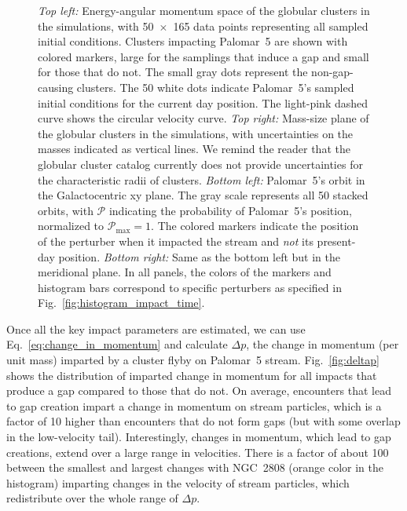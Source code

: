 \begin{figure}
            \caption{\textit{Top left:} Energy-angular momentum space of the globular clusters in the simulations, with 50~$\times$~165 data points representing all sampled initial conditions. Clusters impacting Palomar~5 are shown with colored markers, large for the samplings that induce a gap and small for those that do not. The small gray dots represent the non-gap-causing clusters. The 50 white dots indicate Palomar~5's sampled initial conditions for the current day position. The light-pink dashed curve shows the circular velocity curve. \textit{Top right:} Mass-size plane of the globular clusters in the simulations, with uncertainties on the masses indicated as vertical lines. We remind the reader that the globular cluster catalog currently does not provide uncertainties for the characteristic radii of clusters. \textit{Bottom left:} Palomar~5's orbit in the Galactocentric xy plane. The gray scale represents all 50 stacked orbits, with $\mathcal{P}$ indicating the probability of Palomar~5's position, normalized to $\mathcal{P}_\textrm{max}=1$. The colored markers indicate the position of the perturber when it impacted the stream and \textit{not} its present-day position. \textit{Bottom right:} Same as the bottom left but in the meridional plane. In all panels, the colors of the markers and histogram bars correspond to specific perturbers as specified in Fig.~\ref{fig:histogram_impact_time}.}
            \label{fig:mass_size_plane}
        \end{figure}        
      
        Once all the key impact parameters are estimated, we can use Eq.~\ref{eq:change_in_momentum} and calculate $\Delta p$, the change in momentum (per unit mass) imparted by a cluster flyby on Palomar~5 stream. Fig.~\ref{fig:deltap} shows the distribution of imparted change in momentum for all impacts that produce a gap compared to those that do not. On average, encounters that lead to gap creation impart a change in momentum on stream particles, which is a factor of 10 higher than encounters that do not form gaps (but with some overlap in the low-velocity tail). Interestingly, changes in momentum, which lead to gap creations, extend over a large range in velocities. There is a factor of about 100 between the smallest and largest changes with NGC~2808 (orange color in the histogram) imparting changes in the velocity of stream particles, which redistribute over the whole range of $\Delta p$. 


